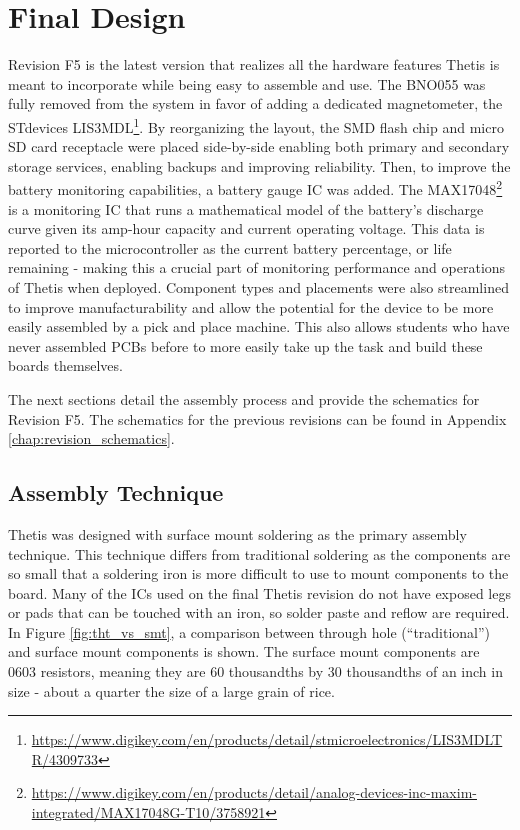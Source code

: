 \section{Final Design} 
Revision F5 is the latest version that realizes all the hardware features Thetis is meant to incorporate while being easy to assemble and use.
The BNO055 was fully removed from the system in favor of adding a dedicated magnetometer, the STdevices LIS3MDL\footnote{\url{https://www.digikey.com/en/products/detail/stmicroelectronics/LIS3MDLTR/4309733}}.
By reorganizing the layout, the SMD flash chip and micro SD card receptacle were placed side-by-side enabling both primary and secondary storage services, enabling backups and improving reliability.
Then, to improve the battery monitoring capabilities, a battery gauge IC was added.
The MAX17048\footnote{\url{https://www.digikey.com/en/products/detail/analog-devices-inc-maxim-integrated/MAX17048G-T10/3758921}} is a monitoring IC that runs a mathematical model of the battery's discharge curve given its amp-hour capacity and current operating voltage.
This data is reported to the microcontroller as the current battery percentage, or life remaining - making this a crucial part of monitoring performance and operations of Thetis when deployed.
Component types and placements were also streamlined to improve manufacturability and allow the potential for the device to be more easily assembled by a pick and place machine.
This also allows students who have never assembled PCBs before to more easily take up the task and build these boards themselves.


The next sections detail the assembly process and provide the schematics for Revision F5.
The schematics for the previous revisions can be found in Appendix \ref{chap:revision_schematics}.



\subsection{Assembly Technique} 
Thetis was designed with surface mount soldering as the primary assembly technique.
This technique differs from traditional soldering as the components are so small that a soldering iron is more difficult to use to mount components to the board.
Many of the ICs used on the final Thetis revision do not have exposed legs or pads that can be touched with an iron, so solder paste and reflow are required.
In Figure \ref{fig:tht_vs_smt}, a comparison between through hole (``traditional'') and surface mount components is shown.
The surface mount components are 0603 resistors, meaning they are 60 thousandths by 30 thousandths of an inch in size - about a quarter the size of a large grain of rice.

